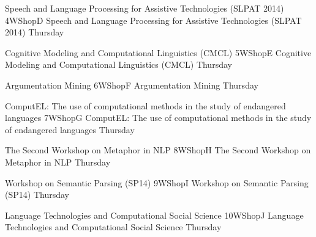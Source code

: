 \begin{wsschedule}
  {Speech and Language Processing for Assistive Technologies (SLPAT 2014)}
  {4}{WShopD}
  {Speech and Language Processing for Assistive Technologies (SLPAT 2014)}
  {Thursday}
  {\WShopLocD}
  
\end{wsschedule}
\begin{wsschedule}
  {Cognitive Modeling and Computational Linguistics (CMCL)}
  {5}{WShopE}
  {Cognitive Modeling and Computational Linguistics (CMCL)}
  {Thursday}
  {\WShopLocE}
  
\end{wsschedule}
\begin{wsschedule}
  {Argumentation Mining}
  {6}{WShopF}
  {Argumentation Mining}
  {Thursday}
  {\WShopLocF}
  
\end{wsschedule}
\begin{wsschedule}
  {ComputEL: The use of computational methods in the study of endangered languages}
  {7}{WShopG}
  {ComputEL: The use of computational methods in the study of endangered languages}
  {Thursday}
  {\WShopLocG}
  
\end{wsschedule}
\begin{wsschedule}
  {The Second Workshop on Metaphor in NLP}
  {8}{WShopH}
  {The Second Workshop on Metaphor in NLP}
  {Thursday}
  {\WShopLocH}
  
\end{wsschedule}
\begin{wsschedule}
  {Workshop on Semantic Parsing (SP14)}
  {9}{WShopI}
  {Workshop on Semantic Parsing (SP14)}
  {Thursday}
  {\WShopLocI}
  
\end{wsschedule}
\begin{wsschedule}
  {Language Technologies and Computational Social Science}
  {10}{WShopJ}
  {Language Technologies and Computational Social Science}
  {Thursday}
  {\WShopLocJ}
  
\end{wsschedule}


